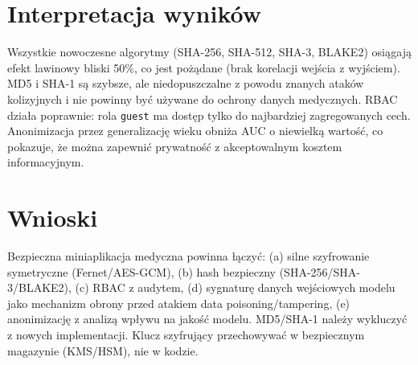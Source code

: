 \documentclass[12pt,a4paper]{article}
\begin{document}
\section{Interpretacja wyników}
Wszystkie nowoczesne algorytmy (SHA-256, SHA-512, SHA-3, BLAKE2) osiągają efekt lawinowy bliski 50\%, co jest pożądane (brak korelacji wejścia z wyjściem). MD5 i SHA-1 są szybsze, ale niedopuszczalne z powodu znanych ataków kolizyjnych i nie powinny być używane do ochrony danych medycznych. RBAC działa poprawnie: rola \texttt{guest} ma dostęp tylko do najbardziej zagregowanych cech. Anonimizacja przez generalizację wieku obniża AUC o niewielką wartość, co pokazuje, że można zapewnić prywatność z akceptowalnym kosztem informacyjnym.

\section{Wnioski}
Bezpieczna miniaplikacja medyczna powinna łączyć: (a) silne szyfrowanie symetryczne (Fernet/AES-GCM), (b) hash bezpieczny (SHA-256/SHA-3/BLAKE2), (c) RBAC z audytem, (d) sygnaturę danych wejściowych modelu jako mechanizm obrony przed atakiem data poisoning/tampering, (e) anonimizację z analizą wpływu na jakość modelu. MD5/SHA-1 należy wykluczyć z nowych implementacji. Klucz szyfrujący przechowywać w bezpiecznym magazynie (KMS/HSM), nie w kodzie.
\end{document}
